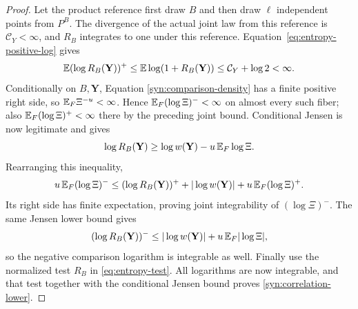 \begin{proof}
Let the product reference first draw \(B\) and then draw \(\ell\)
independent points from \(P^B\).  The divergence of the actual joint law
from this reference is \(\mathcal C_Y<\infty\), and \(R_B\) integrates to one under this
reference.  Equation~\eqref{eq:entropy-positive-log} gives
\begin{equation}\label{syn:positive-comparison-log}
 \mathbb E(\log R_B(\mathbf Y))^+
 \le\mathbb E\log(1+R_B(\mathbf Y))\le\mathcal C_Y+\log2<\infty.
\end{equation}
Conditionally on \(B,\mathbf Y\), Equation
\eqref{syn:comparison-density} has a finite positive right side, so
\(\mathbb E_F\Xi^{-u}<\infty\).  Hence
\(\mathbb E_F(\log\Xi)^-<\infty\) on almost every such fiber; also
\(\mathbb E_F(\log\Xi)^+<\infty\) there by the preceding joint bound.
Conditional Jensen is now legitimate and gives
\[
 \log R_B(\mathbf Y)
 \ge\log w(\mathbf Y)-u\,\mathbb E_F\log\Xi.
\]
Rearranging this inequality,
\[
 u\,\mathbb E_F(\log\Xi)^-
 \le(\log R_B(\mathbf Y))^+
       +|\log w(\mathbf Y)|+u\,\mathbb E_F(\log\Xi)^+.
\]
Its right side has finite expectation, proving joint integrability of
\((\log\Xi)^-\).  The same Jensen lower bound gives
\[
 (\log R_B(\mathbf Y))^-
 \le|\log w(\mathbf Y)|+u\,\mathbb E_F|\log\Xi|,
\]
so the negative comparison logarithm is integrable as well.
Finally use the normalized test \(R_B\) in \eqref{eq:entropy-test}.
All logarithms are now integrable, and that test together with the
conditional Jensen bound proves \eqref{syn:correlation-lower}.
\end{proof}

